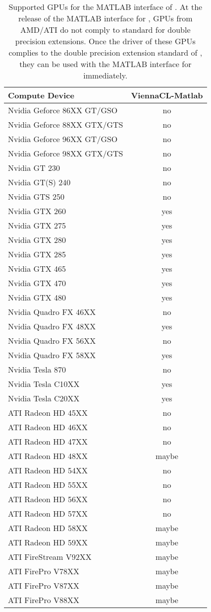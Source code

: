 \begin{table}[tb]
\begin{center}
\begin{tabular}{l|c}
Compute Device & ViennaCL-Matlab \\
\hline
Nvidia Geforce 86XX GT/GSO   & no \\
Nvidia Geforce 88XX GTX/GTS  & no \\
Nvidia Geforce 96XX GT/GSO   & no \\
Nvidia Geforce 98XX GTX/GTS  & no \\
Nvidia GT 230     & no \\
Nvidia GT(S) 240  & no \\
Nvidia GTS 250    & no \\
Nvidia GTX 260    & yes \\
Nvidia GTX 275    & yes \\
Nvidia GTX 280    & yes \\
Nvidia GTX 285    & yes \\
Nvidia GTX 465    & yes \\
Nvidia GTX 470    & yes \\
Nvidia GTX 480    & yes \\
Nvidia Quadro FX 46XX & no \\
Nvidia Quadro FX 48XX & yes \\
Nvidia Quadro FX 56XX & no \\
Nvidia Quadro FX 58XX & yes \\
Nvidia Tesla 870    & no \\
Nvidia Tesla C10XX  & yes \\
Nvidia Tesla C20XX  & yes \\
\hline
ATI Radeon HD 45XX   & no \\
ATI Radeon HD 46XX   & no \\
ATI Radeon HD 47XX   & no \\
ATI Radeon HD 48XX   & maybe \\
ATI Radeon HD 54XX   & no \\
ATI Radeon HD 55XX   & no \\
ATI Radeon HD 56XX   & no \\
ATI Radeon HD 57XX   & no \\
ATI Radeon HD 58XX   & maybe \\
ATI Radeon HD 59XX   & maybe \\
ATI FireStream V92XX & maybe \\
ATI FirePro V78XX    & maybe \\
ATI FirePro V87XX    & maybe \\
ATI FirePro V88XX    & maybe \\
\end{tabular}
\caption{Supported GPUs for the MATLAB interface of {\ViennaCL}. At the release of the MATLAB interface for {\ViennaCLversion}, GPUs from AMD/ATI do not comply to {\OpenCL} standard for double precision extensions. Once the driver of these GPUs complies to the double precision extension standard of {\OpenCL}, they can be used with the MATLAB interface for {\ViennaCL} immediately.}
\label{tab:double-precision-GPUs}
\end{center}
\end{table}
